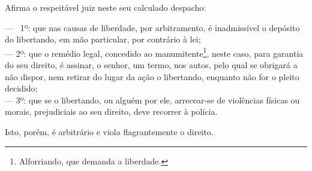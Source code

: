 Afirma o respeitável juiz neste seu calculado despacho:

--- ~1º: que nas causas de liberdade, por arbitramento, é inadmissível
o depósito do libertando, em mão particular, por contrário à lei;\\
--- 2º: que o remédio legal, concedido ao manumitente\footnote{
  Alforriando, que demanda a liberdade.}, neste caso, para garantia do
seu direito, é assinar, o senhor, um termo, nos autos, pelo qual se
obrigará a não dispor, nem retirar do lugar da ação o libertando,
enquanto não for o pleito decidido;\\
--- 3º: que se o libertando, ou alguém por ele, arrecear-se de
violências físicas ou morais, prejudiciais ao seu direito, deve recorrer
à polícia.

Isto, porém, é arbitrário e viola flagrantemente o direito.

